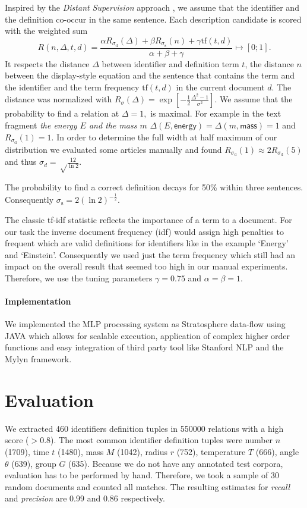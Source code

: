 \documentclass[runningheads]{llncs}
\begin{document}
Inspired by the \emph{Distant Supervision} approach \cite{Mintz2008},
we assume that the identifier and the definition co-occur in the same sentence.
Each description candidate is scored with the weighted sum
\begin{equation} \label{eq:rating}
R(n,\Delta,t,d)=\frac{\alpha{R}_{\sigma_\mathrm d}(\Delta)
+\beta{R}_{\sigma_\mathrm s}(n)
+\gamma\mathrm{tf}(t,d)}{\alpha+\beta+\gamma} \mapsto [0;1].
\end{equation}
It respects the distance $\Delta$ between identifier and definition term $t$, the distance $n$ between the display-style equation and the sentence that contains the term and the identifier and the term frequency $\mathrm{tf}(t,d)$ in the current document $d$.
The distance was normalized with $R_\sigma(\Delta)= \exp\left[-\frac{1}{2}\frac{\Delta^2-1}{\sigma^2}\right].$
We assume that the probability to find a relation at $\Delta=1,$ is maximal.  For example in the text fragment \emph{the energy $E$ and the mass $m$} $\Delta(E,\textsf{energy})=\Delta(m,\textsf{mass})=1$ and $R_{\sigma_\mathrm d}(1)=1.$  
In order to determine the full width at half maximum of our distribution we evaluated some articles manually and found $R_{\sigma_\mathrm d}(1)\approx 2 R_{\sigma_\mathrm d}(5)$ and thus 
$\sigma_d=\sqrt\frac{12}{\ln 2}$.

The probability to find a correct definition decays for 50\% within three sentences.
Consequently  $\sigma_\mathrm s=2\left({\ln 2}\right)^{-\frac{1}{2}}$.

The classic tf-idf \cite{Salton86} statistic reflects the importance of a term to a document.
For our task the inverse document frequency (idf)  would assign high penalties to frequent which are valid definitions for identifiers like in the example `Energy' and `Einstein'.
Consequently we used just the term frequency which still had an impact on the overall result 
that seemed too high in our manual experiments.
Therefore, we use the tuning parameters $\gamma=0.75$ and $\alpha = \beta = 1$.

\paragraph{Implementation}
We implemented the MLP processing system \cite{github} as Stratosphere data-flow using JAVA which allows for scalable execution, application of complex higher order functions and easy integration of third party tool like Stanford NLP and the Mylyn framework.

\section{Evaluation}
We extracted 460 identifiers definition tuples in 550000 relations with a
high score ($>0.8$).
The most common identifier definition tuples were 
number $n$ (1709), time $t$	(1480), mass $M$ (1042), radius $r$ (752), temperature	$T$	(666), angle $\theta$ (639), group $G$ (635).
Because we do not have any annotated test corpora,
evaluation has to be performed by hand.
Therefore, we took a sample of 30
random documents and counted all matches.
The resulting estimates for
\emph{recall} and \emph{precision} are 0.99 and 0.86 respectively.
\end{document}
